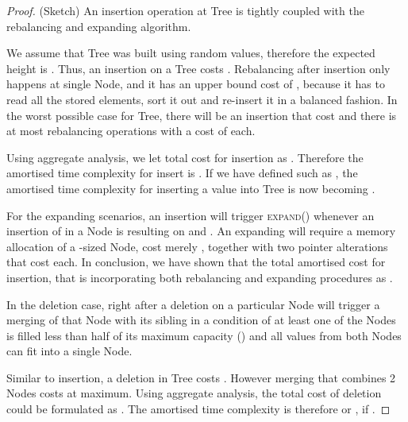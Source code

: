 \begin{proof} (Sketch) An insertion operation at Tree is tightly coupled
with the rebalancing and expanding algorithm. 

We assume that Tree was built using random values, therefore the 
expected height is . 
Thus, an insertion on a Tree costs . 
Rebalancing after insertion only happens
at single Node, and it has an upper bound cost of ,
because it has to read all the stored elements, sort it out and re-insert it in a balanced fashion.  
In the worst possible case for Tree, there will be an  insertion 
that cost  and there is at most  rebalancing operations with a cost of
 each. 

Using aggregate analysis, we let total cost for insertion 
as . Therefore the amortised time complexity 
for insert is . If we have defined  such as 
, the amortised time complexity for inserting a value into Tree 
is now becoming .

For the expanding scenarios, an insertion will trigger \textsc{expand}()
whenever an insertion of  in a Node  is resulting on  and
. An expanding will require a memory allocation
of a -sized Node, cost merely , together with two pointer
alterations that cost  each. In conclusion, we have shown that
the total amortised cost for insertion, that is incorporating both rebalancing
and expanding procedures as .

In the deletion case, right after a deletion on a particular Node 
will trigger a merging of that Node with its sibling in a condition 
of at least one of the Nodes is filled less than half
of its maximum capacity () and all values from both 
Nodes can fit into a single Node.

Similar to insertion, a deletion in Tree costs . However merging that combines
2 Nodes costs  at maximum. Using aggregate analysis, 
the total cost of deletion could be formulated as
. The amortised time complexity is 
therefore  or , if .

\end{proof}



